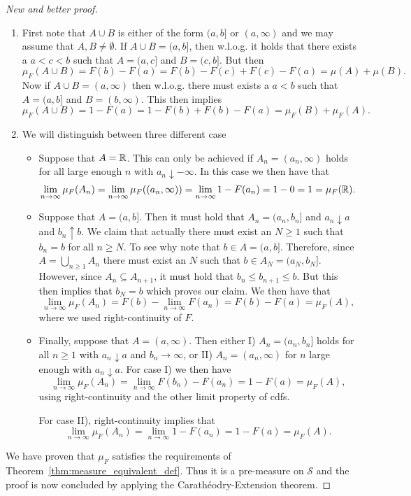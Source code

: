 \begin{proof}[New and better proof]
\begin{enumerate}
\item First note that $A \cup B$ is either of the form $(a,b]$ or $(a,\infty)$ and we may assume that $A,B \ne \emptyset$. If $A \cup B = (a,b]$, then w.l.o.g. it holds that there exists a $a < c < b$ such that $A = (a,c]$ and $B = (c, b]$. But then
\[
	\mu_F(A \cup B) = F(b) - F(a) = F(b) - F(c) + F(c) - F(a) = \mu(A) + \mu(B). 
\]
Now if $A \cup B = (a, \infty)$ then w.l.o.g. there must exists a $a < b$ such that $A = (a,b]$ and $B = (b, \infty)$. This then implies
\[
	\mu_F(A \cup B) = 1 - F(a) = 1 - F(b) + F(b) - F(a) = \mu_F(B) + \mu_F(A).
\]
\item We will distinguish between three different case
\begin{itemize}
\item Suppose that $A = \mathbb R$. This can only be achieved if $A_n = (a_n, \infty)$ holds for all large enough $n$ with $a_n \downarrow -\infty$. In this case we then have that
\[
	\lim_{n \to \infty} \mu_F(A_n) = \lim_{n \to \infty} \mu_F((a_n, \infty)) = \lim_{n \to \infty} 1 - F(a_n)
	= 1 - 0 = 1 = \mu_F(\mathbb R).
\]
\item Suppose that $A = (a,b]$. Then it must hold that $A_n = (a_n, b_n]$ and $a_n \downarrow a$ and $b_n \uparrow b$. We claim that actually there must exist an $N \ge 1$ such that $b_n = b$ for all $n \ge N$. To see why note that $b \in A = (a,b]$. Therefore, since $A = \bigcup_{n \ge 1} A_n$ there must exist an $N$ such that $b \in A_N = (a_N, b_N]$. However, since $A_n \subseteq A_{n +1}$, it must hold that $b_n \le b_{n+1} \le b$. But this then implies that $b_N = b$ which proves our claim. We then have that
\[
	\lim_{n \to \infty} \mu_F(A_n) = F(b) - \lim_{n \to \infty} F(a_n) = F(b) - F(a) = \mu_F(A),
\]
where we used right-continuity of $F$.
\item Finally, suppose that $A = (a, \infty)$. Then either I) $A_n = (a_n, b_n]$ holds for all $n \ge 1$ with $a_n \downarrow a$ and $b_n \to \infty$, or II) $A_n = (a_n, \infty)$ for $n$ large enough with $a_n \downarrow a$. For case I) we then have
\[
	\lim_{n \to \infty} \mu_F(A_n) = \lim_{n \to \infty} F(b_n) - F(a_n) = 1 - F(a) = \mu_F(A), 
\]
using right-continuity and the other limit property of cdfs. 

For case II), right-continuity implies that
\[
	\lim_{n \to \infty} \mu_F(A_n) = \lim_{n \to \infty} 1 - F(a_n) = 1 - F(a) = \mu_F(A).
\]
\end{itemize}
\end{enumerate}

We have proven that $\mu_F$ satisfies the requirements of Theorem~\ref{thm:measure_equivalent_def}. Thus it is a pre-measure on $\mathcal{S}$ and the proof is now concluded by applying the Carath\'{e}odry-Extension theorem.

\end{proof}

